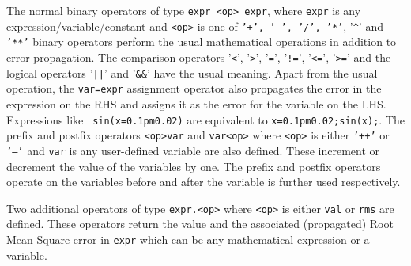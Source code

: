 \documentclass[11pt]{article}
\begin{document}
The normal binary operators of type {\tt expr <op> expr}, where {\tt expr} is any
expression/variable/constant and {\tt <op>} is one of {\tt '+', '-', '/', '*'},
'{\texttt{\^}}' and {\tt '**'} binary operators perform the usual mathematical operations
in addition to error propagation.  The comparison operators '{\texttt{<}}',
'{\texttt{>}}', '{\texttt{=}}', '{\texttt{!}}{\texttt{=}}', '{\texttt{<}}{\texttt{=}}',
'{\texttt{>}}{\texttt{=}}' and the logical operators '{\texttt{|}}{\texttt{|}}' and
'{\texttt{\&}}{\texttt{\&}}' have the usual meaning.  Apart from the usual operation, the
{\tt var=expr} assignment operator also propagates the error in the expression on the RHS
and assigns it as the error for the variable on the LHS.  Expressions like {\tt
  sin(x=0.1pm0.02)} are equivalent to {\tt x=0.1pm0.02;sin(x);}.  The prefix and
postfix operators {\tt <op>var} and {\tt var<op>} where {\tt <op>} is either {\tt '++'}
or {\tt '--'} and {\tt var} is any user-defined variable are also defined.  These
increment or decrement the value of the variables by one.  The prefix and postfix
operators operate on the variables before and after the variable is further used
respectively.

Two additional operators of type {\tt expr.<op>} where {\tt <op>} is either {\tt val} or
{\tt rms} are defined.  These operators return the value and the associated (propagated)
Root Mean Square error in {\tt expr} which can be any mathematical expression or a
variable.
\end{document}
